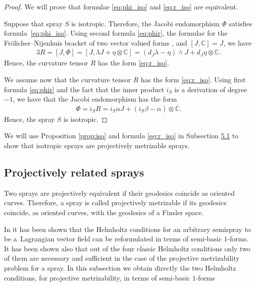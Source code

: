 \documentclass[11pt]{article}
\numberwithin{equation}{section}
\begin{document}
\begin{proof}
We will prove that formulae \eqref{eq:phi_iso} and \eqref{eq:r_iso}
are equivalent.

Suppose that spray $S$ is isotropic. Therefore, the Jacobi endomorphism
$\Phi$ satisf\/ies formu\-la~\eqref{eq:phi_iso}. Using second formula
\eqref{eq:phir}, the formulae for the Fr\"olicher--Nijenhuis bracket of
two vector valued forms \cite[Appendix~A1]{grifone00}, and $[J, \mathbb{C}]=J$, we have
\begin{gather*}
3R=[J,\Phi]=[J, \lambda J + \eta\otimes \mathbb{C}] =
\left(d_J\lambda-\eta\right)\wedge J + d_J\eta \otimes \mathbb{C}. %
\end{gather*} Hence, the curvature tensor $R$ has the form
\eqref{eq:r_iso}.

We assume now that the curvature tensor $R$ has the form
\eqref{eq:r_iso}.  Using f\/irst formula \eqref{eq:phir} and the fact
that the inner product $i_S$ is a derivation of degree $-1$, we have
that the Jacobi endomorphism has the form
\begin{gather*}
\Phi=i_SR=i_S\alpha J + \left(i_S\beta-\alpha\right)\otimes
\mathbb{C}. %
\end{gather*} Hence, the spray $S$ is isotropic.
\end{proof}

We will use  Proposition \ref{prop:iso} and formula \eqref{eq:r_iso} in
Subsection \href{https://doi.org/10.3842/SIGMA.2011.114}{5.1} to show that isotropic sprays are
projectively metrizable sprays.


\subsection{Projectively related sprays} \label{subsec:prs}

Two sprays are projectively equivalent if their geodesics
coincide as oriented curves. Therefore, a spray is called projectively
metrizable if its geodesics coincide, as oriented curves, with the
geodesics of a Finsler space.

In \cite{bucataru09} it has been shown that the Helmholtz conditions for an
arbitrary semispray to be a~Lag\-rangian vector f\/ield can be
reformulated in terms of semi-basic $1$-forms. It has been shown also
that out of the four classic Helmholtz conditions only two of them are necessary and suf\/f\/icient
in the case of the projective metrizability problem for a spray. In this
subsection we obtain directly the two Helmholtz conditions, for
projective metrizability, in terms of semi-basic $1$-forms
\end{document}
